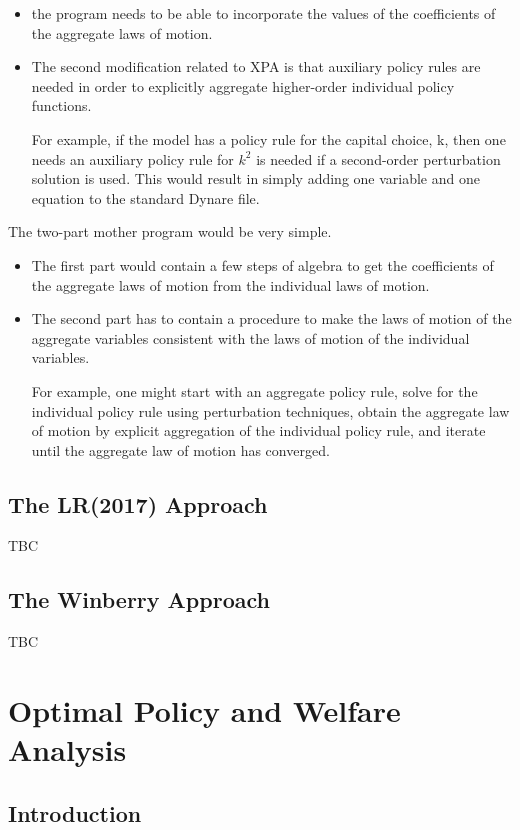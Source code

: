 \documentclass[10pt,math=newtx,citestyle=gb7714-2015,bibstyle=gb7714-2015]{elegantbook}
\begin{document}
{	\begin{itemize}
		\item the program needs to be able to incorporate the values of the coefficients of the aggregate laws of motion.
		\item The second modification related to XPA is that auxiliary policy rules are needed in order to explicitly aggregate higher-order individual policy functions.
		
		For example, if the model has a policy rule for the capital choice, k, then one needs an auxiliary policy rule for $k^2$ is needed if a second-order perturbation solution is used. This would result in simply adding one variable and one equation to the standard Dynare file.
	\end{itemize}
	
	The two-part mother program would be very simple.
	\begin{itemize}
		\item The first part would contain a few steps of algebra to get the coefficients of the aggregate laws of motion from the individual laws of motion.
		\item The second part has to contain a procedure to make the laws of motion of the aggregate variables consistent with the laws of motion of the individual variables.
		
		For example, one might start with an aggregate policy rule, solve for the individual policy rule using perturbation techniques, obtain the aggregate law of motion by explicit aggregation of the individual policy rule, and iterate until the aggregate law of motion has converged.
	\end{itemize}
	
	\section{The LR(2017) Approach}
	
	TBC
	
	\section{The Winberry Approach}
	
	TBC
	
	\chapter{Optimal Policy and Welfare Analysis}
	
	\section{Introduction}
	
}
\end{document}
